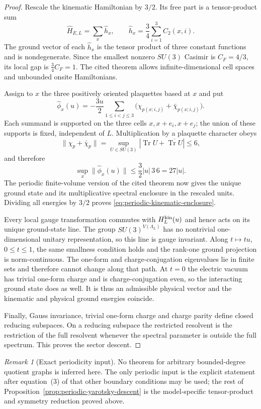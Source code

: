 \documentclass[11pt]{article}
\theoremstyle{plain}
\theoremstyle{definition}
\theoremstyle{remark}
\newtheorem{remark}[theorem]{Remark}
\begin{document}
\begin{proof}
Rescale the kinematic Hamiltonian by $3/2$.  Its free part is a tensor-product
sum
\[
 \widehat H_{E,L}=\sum_x\widehat h_x,
 \qquad
 \widehat h_x=\frac34\sum_{i=1}^3C_2(x,i).
\]
The ground vector of each $\widehat h_x$ is the tensor product of three
constant functions and is nondegenerate.  Since the smallest nonzero
$SU(3)$ Casimir is $C_F=4/3$, its local gap is
$\tfrac34C_F=1$.  The cited theorem allows infinite-dimensional cell spaces
and unbounded onsite Hamiltonians.

Assign to $x$ the three positively oriented plaquettes based at $x$ and put
\[
 \widehat\phi_x(u)=-\frac{3u}{2}
 \sum_{1\le i<j\le3}
 \bigl(\chi_{p(x;i,j)}+\bar\chi_{p(x;i,j)}\bigr).
\]
Each summand is supported on the three cells
$x,x+e_i,x+e_j$; the union of these supports is fixed, independent of $L$.
Multiplication by a plaquette character obeys
\[
 \|\chi_p+\bar\chi_p\|
 =\sup_{U\in SU(3)}|\operatorname{Tr}U+\overline{\operatorname{Tr}U}|
 \le6,
\]
and therefore
\[
 \sup_x\|\widehat\phi_x(u)\|
 \le\frac32|u|\,3\,6=27|u|.
\]
The periodic finite-volume version of the cited theorem now gives the unique
ground state and its multiplicative spectral enclosure in the rescaled
units. Dividing all energies by $3/2$ proves
\eqref{eq:periodic-kinematic-enclosure}.

Every local gauge transformation commutes with $H_L^{\rm kin}(u)$ and hence
acts on its unique ground-state line.  The group $SU(3)^{V(\Lambda_L)}$ has no
nontrivial one-dimensional unitary representation, so this line is gauge
invariant.  Along $t\mapsto tu$, $0\le t\le1$, the same smallness condition
holds and the rank-one ground projection is norm-continuous.  The one-form
and charge-conjugation eigenvalues lie in finite sets and therefore cannot
change along that path.  At $t=0$ the electric vacuum has trivial one-form
charge and is charge-conjugation even, so the interacting ground state does
as well.  It is thus an admissible physical vector and the kinematic and
physical ground energies coincide.

Finally, Gauss invariance, trivial one-form charge and charge parity define
closed reducing subspaces.  On a reducing subspace the restricted resolvent
is the restriction of the full resolvent whenever the spectral parameter is
outside the full spectrum.  This proves the sector descent.
\end{proof}

\begin{remark}[Exact periodicity input]
No theorem for arbitrary bounded-degree quotient graphs is inferred here.
The only periodic input is the explicit statement after equation~(3) of
\cite{Yarotsky2004QP} that other boundary conditions may be used; the rest of
Proposition~\ref{prop:periodic-yarotsky-descent} is the model-specific
tensor-product and symmetry reduction proved above.
\end{remark}
\end{document}
